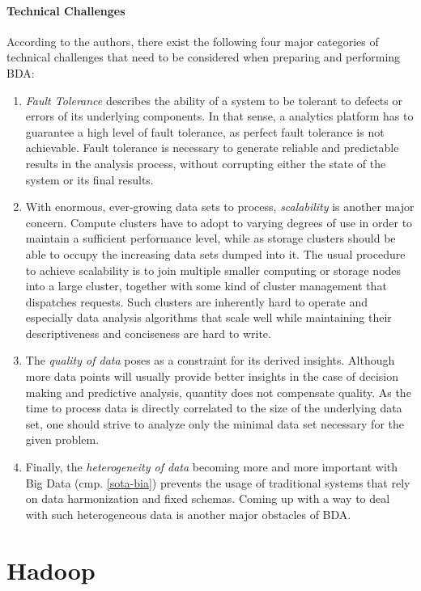 \paragraph{Technical Challenges}
According to the authors, there exist the following four major categories of technical challenges that need to be considered when preparing and performing \ac{BDA}:

\begin{enumerate}
    \item \emph{Fault Tolerance} describes the ability of a system to be tolerant to defects or errors of its underlying components. In that sense, a analytics platform has to guarantee a high level of fault tolerance, as perfect fault tolerance is not achievable. Fault tolerance is necessary to generate reliable and predictable results in the analysis process, without corrupting either the state of the system or its final results.
    \item With enormous, ever-growing data sets to process, \emph{scalability} is another major concern. Compute clusters have to adopt to varying degrees of use in order to maintain a sufficient performance level, while as storage clusters should be able to occupy the increasing data sets dumped into it. The usual procedure to achieve scalability is to join multiple smaller computing or storage nodes into a large cluster, together with some kind of cluster management that dispatches requests. Such clusters are inherently hard to operate and especially data analysis algorithms that scale well while maintaining their descriptiveness and conciseness are hard to write.
    \item The \emph{quality of data} poses as a constraint for its derived insights. Although more data points will usually provide better insights in the case of decision making and predictive analysis, quantity does not compensate quality. As the time to process data is directly correlated to the size of the underlying data set, one should strive to analyze only the minimal data set necessary for the given problem.
    \item Finally, the \emph{heterogeneity of data} becoming more and more important with Big Data (cmp. \autoref{sota-bia}) prevents the usage of traditional systems that rely on data harmonization and fixed schemas. Coming up with a way to deal with such heterogeneous data is another major obstacles of \ac{BDA}.
\end{enumerate}


\section{Hadoop}

